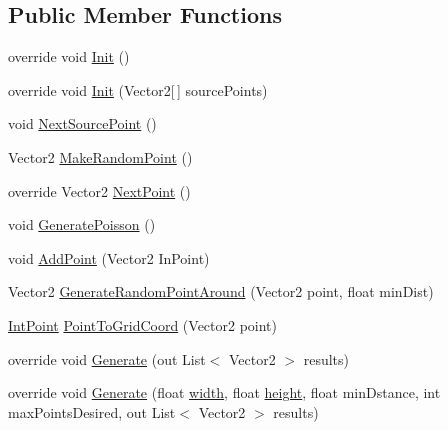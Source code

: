 \subsection*{Public Member Functions}
\begin{DoxyCompactItemize}
\item 
override void \mbox{\hyperlink{class_poisson_disk_sampling_a1a571483a8940424916aa1266576161e}{Init}} ()
\item 
override void \mbox{\hyperlink{class_poisson_disk_sampling_abd6053768abe24749eee699ce914eceb}{Init}} (Vector2\mbox{[}$\,$\mbox{]} source\+Points)
\item 
void \mbox{\hyperlink{class_poisson_disk_sampling_a5d3b4212b8f786be4e849b93ca096ab6}{Next\+Source\+Point}} ()
\item 
Vector2 \mbox{\hyperlink{class_poisson_disk_sampling_a4d173da254062579395c756861467e93}{Make\+Random\+Point}} ()
\item 
override Vector2 \mbox{\hyperlink{class_poisson_disk_sampling_a6e0e9060e58c98193329d0661a64a5ed}{Next\+Point}} ()
\item 
void \mbox{\hyperlink{class_poisson_disk_sampling_a96daccb88a2edb1f835d3ed8e19ace2e}{Generate\+Poisson}} ()
\item 
void \mbox{\hyperlink{class_poisson_disk_sampling_acfa775a97fe1210f2b28188464f8092b}{Add\+Point}} (Vector2 In\+Point)
\item 
Vector2 \mbox{\hyperlink{class_poisson_disk_sampling_aadc97855167d6531a56c9099101877d0}{Generate\+Random\+Point\+Around}} (Vector2 point, float min\+Dist)
\item 
\mbox{\hyperlink{struct_int_point}{Int\+Point}} \mbox{\hyperlink{class_poisson_disk_sampling_a3489e3f81cc5c5fa5087e8edb7042659}{Point\+To\+Grid\+Coord}} (Vector2 point)
\item 
override void \mbox{\hyperlink{class_poisson_disk_sampling_a93700de987a5b4bf64da7cd0db070534}{Generate}} (out List$<$ Vector2 $>$ results)
\item 
override void \mbox{\hyperlink{class_poisson_disk_sampling_af2aeccc94efa7d224044f730fc432bcf}{Generate}} (float \mbox{\hyperlink{class_poisson_disk_sampling_a0b32f3e1950036797fb17575da924b8e}{width}}, float \mbox{\hyperlink{class_poisson_disk_sampling_aa75a106477c40f9d1200f3ae71dd544f}{height}}, float min\+Dstance, int max\+Points\+Desired, out List$<$ Vector2 $>$ results)
\end{DoxyCompactItemize}
